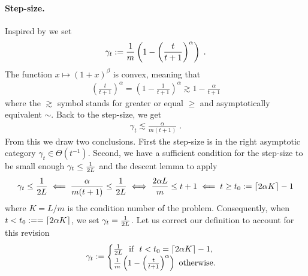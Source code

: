 \documentclass{article}
\newcommand{\lr}{\gamma} %
\begin{document}
\paragraph{Step-size.}
Inspired by \citet{gower2019sgd} we set
\begin{align}
	\lr_t := \inv{m} \left ( 1 - \left (\frac{t}{t+1} \right)^\alpha \right ) \; .
\end{align}
The function $x\mapsto (1+x)^\beta$ is convex, meaning that 
\begin{align}
	\left (\frac{t}{t+1} \right)^\alpha 
	= \left (1 - \frac{1}{t+1} \right)^\alpha 
	\gtrsim 1 - \frac{\alpha}{t+1}
\end{align}
where the $\gtrsim$ symbol stands for greater or equal $\geq$ and asymptotically equivalent $\sim$.
Back to the step-size, we get
\begin{align}
	\lr_t \lesssim \frac{\alpha}{m(t+1)} \; .
	\label{eq:lr_asymptote}
\end{align} 
From this we draw two conclusions.
First the step-size is in the right asymptotic category $\lr_t \in \Theta(t^{-1})$.
Second, we have a sufficient condition for the step-size to be small enough $\lr_t \leq \inv{2L}$ and the descent lemma to apply
\begin{align}
	\lr_t \leq \inv{2L}
	\impliedby \frac{\alpha}{m(t+1)}  \leq \inv{2L} 
	\iff \frac{2 \alpha L}{m} \leq t +1
	\impliedby t \geq t_0 := \ceil{2\alpha K} -1
\end{align}
where $K= L/m$ is the condition number of the problem.
Consequently, when $t < t_0 :== \lceil 2\alpha K \rceil$, we set $\lr_t = \inv{2L}$.
Let us correct our definition to account for this revision
\begin{equation}
	\lr_t := \begin{cases}
		\inv{2L} \ \text{ if } \ t< t_0 = \ceil{2\alpha K} -1, \\
		\inv{m} \left ( 1 - \left (\frac{t}{t+1} \right)^\alpha \right ) \ \text{otherwise.}
	\end{cases}
\end{equation}
\end{document}
